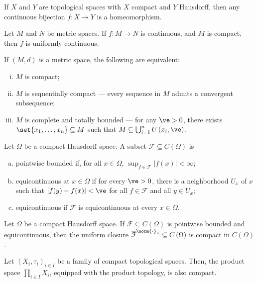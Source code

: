\begin{fact}
  If $X$ and $Y$ are topological spaces with $X$ compact and $Y$ Hausdorff, then any continuous bijection $f\colon X\rightarrow Y$ is a homeomorphism.
\end{fact}
\begin{fact}
  Let $M$ and $N$ be metric spaces. If $f\colon M\rightarrow N$ is continuous, and $M$ is compact, then $f$ is uniformly continuous.
\end{fact}
\begin{fact}
  If $\left(M,d\right)$ is a metric space, the following are equivalent:
  \begin{enumerate}[(i)]
    \item $M$ is compact;
    \item $M$ is sequentially compact --- every sequence in $M$ admits a convergent subsequence;
    \item $M$ is complete and totally bounded --- for any $\ve > 0$, there exists $\set{x_1,\dots,x_n}\subseteq M$ such that $M\subseteq \bigcup_{i=1}^{n}U\left(x_i,\ve\right)$.
  \end{enumerate}
\end{fact}
\begin{definition}
  Let $\Omega$ be a compact Hausdorff space. A subset $\mathcal{F}\subseteq C\left(\Omega\right)$ is
  \begin{enumerate}[(a)]
    \item pointwise bounded if, for all $x\in \Omega$, $\sup_{f\in \mathcal{F}}\left\vert f(x) \right\vert < \infty$;
    \item equicontinuous at $x\in \Omega$ if for every $\ve > 0$, there is a neighborhood $U_x$ of $x$ such that $\left\vert f(y) - f(x) \right\vert < \ve$ for all $f\in \mathcal{F}$ and all $y\in U_x$;
    \item equicontinuous if $\mathcal{F}$ is equicontinuous at every $x\in \Omega$.
  \end{enumerate}
\end{definition}
\begin{theorem}\label{thm:arzela_ascoli}
  Let $\Omega$ be a compact Hausdorff space. If $\mathcal{F}\subseteq C\left(\Omega\right)$ is pointwise bounded and equicontinuous, then the uniform closure $\overline{\mathcal{F}}^{\norm{\cdot}_u}\subseteq C\left(\Omega\right)$ is compact in $C\left(\Omega\right)$.
\end{theorem}
\begin{theorem}\label{thm:tychonoff}
  Let $\left(X_i,\tau_i\right)_{i\in I}$ be a family of compact topological spaces. Then, the product space $\prod_{i\in I}X_i$, equipped with the product topology, is also compact.
\end{theorem}
